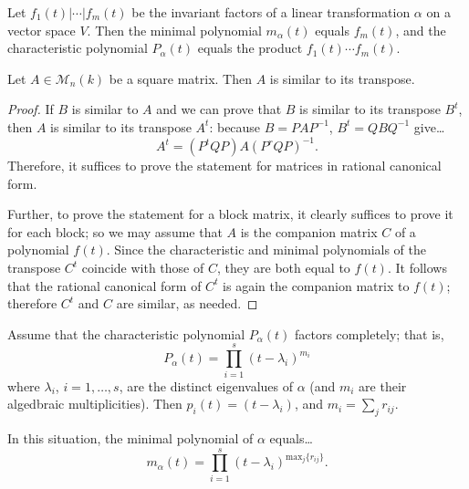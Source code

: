 \begin{proposition}
Let $f_1(t) | \cdots | f_m(t)$ be the invariant factors of a linear transformation $\alpha$ on a vector
space $V$. Then the minimal polynomial $m_{\alpha}(t)$ equals $f_m(t)$, and the characteristic polynomial
$P_{\alpha}(t)$ equals the product $f_1(t)\cdots f_m(t)$.
\end{proposition}

\begin{proposition}
Let $A \in \mathcal{M}_n(k)$ be a square matrix. Then $A$ is similar to its transpose.
\end{proposition}

\begin{proof}
If $B$ is similar to $A$ and we can prove that $B$ is similar to its transpose $B^t$, then $A$ is similar to its transpose
$A^t$: because $B = PAP^{-1}$, $B^t = QBQ^{-1}$ give\dots
$$A^t = (P^tQP)A(P^rQP)^{-1}.$$
Therefore, it suffices to prove the statement for matrices in rational canonical form.

Further, to prove the statement for a block matrix, it clearly suffices to prove it for each block;
so we may assume that $A$ is the companion matrix $C$ of a polynomial $f(t)$. Since the characteristic and
minimal polynomials of the transpose $C^t$ coincide with those of $C$, they are both equal to $f(t)$. It follows
that the rational canonical form of $C^t$ is again the companion matrix to $f(t)$; therefore $C^t$ and $C$
are similar, as needed.
\end{proof}

\begin{lemma}
Assume that the characteristic polynomial $P_{\alpha}(t)$ factors completely; that is,
$$P_{\alpha}(t) = \prod_{i=1}^s(t-\lambda_i)^{m_i}$$
where $\lambda_i$, $i = 1, \dots, s$, are the distinct eigenvalues of $\alpha$ (and $m_i$
are their algedbraic multiplicities). Then $p_i(t) = (t - \lambda_i)$, and $m_i = \sum_j r_{ij}$.

In this situation, the minimal polynomial of $\alpha$ equals\dots
$$m_{\alpha}(t) = \prod^s_{i=1}(t - \lambda_i)^{\textrm{max}_j\{r_{ij}\}}.$$
\end{lemma}

